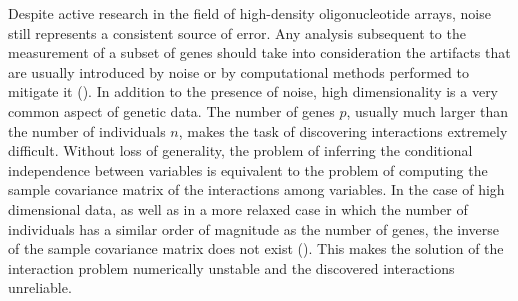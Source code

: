 Despite active research in the field of high-density oligonucleotide arrays, noise still represents a consistent source of error. Any analysis subsequent to the measurement of a subset of genes should take into consideration the artifacts that are usually introduced by noise or by computational methods performed to mitigate it (\citealp{microarray_noise, microarray_high_noise}).
In addition to the presence of noise, high dimensionality is a very common aspect of genetic data. The number of genes $p$, usually much larger than the number of individuals $n$, makes the task of discovering interactions extremely difficult. 
Without loss of generality, the problem of inferring the conditional independence between variables is equivalent to the problem of computing the sample covariance matrix of the interactions among variables. In the case of high dimensional data, as well as in a more relaxed case in which the number of individuals has a similar order of magnitude as the number of genes, the inverse of the sample covariance matrix does not exist (\citealp{Buhl93mle}). This makes the solution of the interaction problem numerically unstable and the discovered interactions unreliable. 

